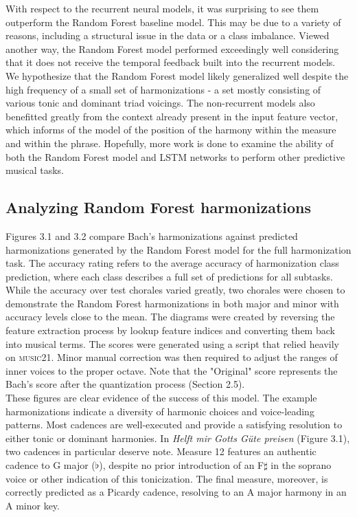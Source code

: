\documentclass[11pt]{book}
\begin{document}
With respect to the recurrent neural models, it was surprising to see them outperform the Random Forest baseline model. This may be due to a variety of reasons, including a structural issue in the data or a class imbalance. Viewed another way, the Random Forest model performed exceedingly well considering that it does not receive the temporal feedback built into the recurrent models. We hypothesize that the Random Forest model likely generalized well despite the high frequency of a small set of harmonizations - a set mostly consisting of various tonic and dominant triad voicings. The non-recurrent models also benefitted greatly from the context already present in the input feature vector, which informs of the model of the position of the harmony within the measure and within the phrase. Hopefully, more work is done to examine the ability of both the Random Forest model and LSTM networks to perform other predictive musical tasks.

\subsection{Analyzing Random Forest harmonizations}

Figures 3.1 and 3.2 compare Bach's harmonizations against predicted harmonizations generated by the Random Forest model for the full harmonization task. The accuracy rating refers to the average accuracy of harmonization class prediction, where each class describes a full set of predictions for all subtasks. While the accuracy over test chorales varied greatly, two chorales were chosen to demonstrate the Random Forest harmonizations in both major and minor with accuracy levels close to the mean. The diagrams were created by reversing the feature extraction process by lookup feature indices and converting them back into musical terms. The scores were generated using a script that relied heavily on \textsc{music21}. Minor manual correction was then required to adjust the ranges of inner voices to the proper octave. Note that the "Original" score represents the Bach's score after the quantization process (Section 2.5). \\

These figures are clear evidence of the success of this model. The example harmonizations indicate a diversity of harmonic choices and voice-leading patterns. Most cadences are well-executed and provide a satisfying resolution to either tonic or dominant harmonies. In \textit{Helft mir Gotts G{\"u}te preisen} (Figure 3.1), two cadences in particular deserve note. Measure 12 features an authentic cadence to G major ($\flat$), despite no prior introduction of an F$\sharp$ in the soprano voice or other indication of this tonicization. The final measure, moreover, is correctly predicted as a Picardy cadence, resolving to an A major harmony in an A minor key. \\
\end{document}
